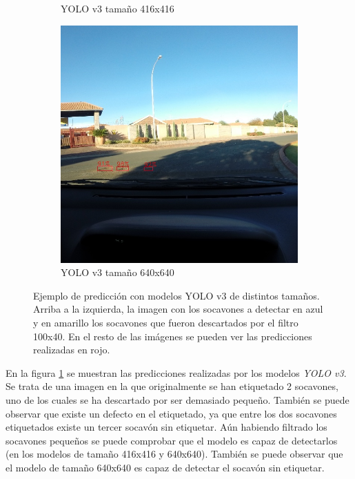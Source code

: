 \begin{figure}[H]
\begin{subfigure}[h]{0.45\linewidth}
		\caption{YOLO v3 tamaño 416x416}
	\end{subfigure}
	\begin{subfigure}[h]{0.45\linewidth}
		\includegraphics[width=\linewidth]{images/results_a_yolo_v3_640.jpg}
		\caption{YOLO v3 tamaño 640x640}
	\end{subfigure}
	\caption{Ejemplo de predicción con modelos YOLO v3 de distintos tamaños. Arriba a la izquierda, la imagen con los socavones a detectar en azul y en amarillo los socavones que fueron descartados por el filtro 100x40. En el resto de las imágenes se pueden ver las predicciones realizadas en rojo.}
	\label{fig:resultsav3}
\end{figure}

En la figura \ref{fig:resultsav3} se muestran las predicciones realizadas por los modelos \textit{YOLO v3}. Se trata de una imagen en la que originalmente se han etiquetado 2 socavones, uno de los cuales se ha descartado por ser demasiado pequeño. También se puede observar que existe un defecto en el etiquetado, ya que entre los dos socavones etiquetados existe un tercer socavón sin etiquetar. Aún habiendo filtrado los socavones pequeños se puede comprobar que el modelo es capaz de detectarlos (en los modelos de tamaño 416x416 y 640x640). También se puede observar que el modelo de tamaño 640x640 es capaz de detectar el socavón sin etiquetar.

